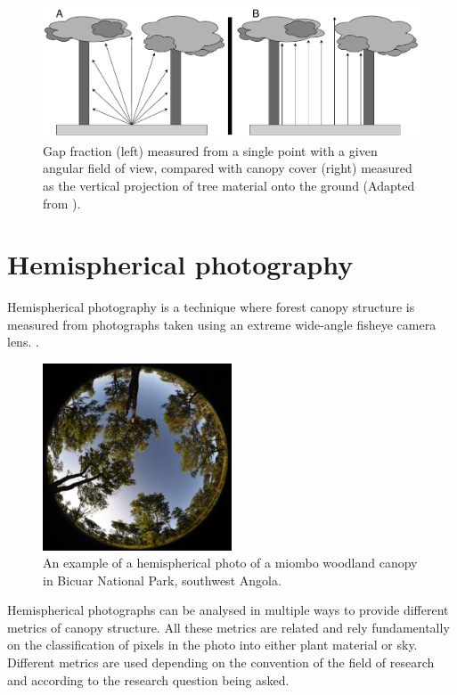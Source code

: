 \documentclass[11pt,a4paper]{article}
\begin{document}
\begin{figure}[H]
\centering
	\includegraphics[width=\textwidth]{closure.drawio.pdf}
	\caption{Gap fraction (left) measured from a single point with a given angular field of view, compared with canopy cover (right) measured as the vertical projection of tree material onto the ground (Adapted from \citealt{Jennings1999}).}
	\label{closure}
\end{figure}

\section{Hemispherical photography}

Hemispherical photography is a technique where forest canopy structure is measured from photographs taken using an extreme wide-angle fisheye camera lens. \citep{Seidel2011, Macfarlane2014}. 

\begin{figure}[H]
\centering
	\includegraphics[width=0.5\textwidth]{hemi.jpg}
	\caption{An example of a hemispherical photo of a miombo woodland canopy in Bicuar National Park, southwest Angola.}
	\label{hemi}
\end{figure}

Hemispherical photographs can be analysed in multiple ways to provide different metrics of canopy structure. All these metrics are related and rely fundamentally on the classification of pixels in the photo into either plant material or sky. Different metrics are used depending on the convention of the field of research and according to the research question being asked. 
\end{document}
